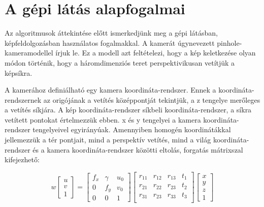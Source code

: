 \documentclass{article}
\begin{document}
	\section{A gépi látás alapfogalmai}
	Az algoritmusok áttekintése előtt ismerkedjünk meg a gépi látásban, képfeldolgozásban használatos fogalmakkal. A kamerát úgynevezett pinhole-kameramodellel írjuk le. Ez a modell azt feltételezi, hogy a kép keletkezése olyan módon történik, hogy a háromdimenziós teret perspektivikusan vetítjük a képsíkra.

%
	
	
A kamerához definiálható egy kamera koordináta-rendszer. Ennek a koordináta-rendszernek az origójának a vetítés középpontját tekintjük, a z tengelye merőleges a vetítés síkjára. A kép koordináta-rendszer síkbeli koordináta-rendszer, a síkra vetített pontokat értelmezzük ebben. x és y tengelyei a kamera koordináta-rendszer tengelyeivel egyirányúak. Amennyiben homogén koordinátákkal jellemezzük a tér pontjait, mind a perspektív vetítés, mind a világ koordináta-rendszer és a kamera koordináta-rendszer közötti eltolás, forgatás mátrixszal kifejezhető: 

\begin{equation}
w\left[
\begin{array}{c}
u \\ v \\ 1
\end{array}
\right] = \left[ 
\begin{array}{ccc}
f_x & \gamma & u_0 \\
0 & f_y & v_0 \\
0 & 0 & 1
\end{array}
\right]\left[
\begin{array}{cccc}
r_{11} & r_{12} & r_{13} & t_1 \\
r_{21} & r_{22} & r_{23} & t_2 \\
r_{31} & r_{23} & r_{33} & t_3 \\
\end{array}
\right]\left[
\begin{array}{c}
x \\ y \\ z \\ 1
\end{array}
\right]
\end{equation}
 
\end{document}
